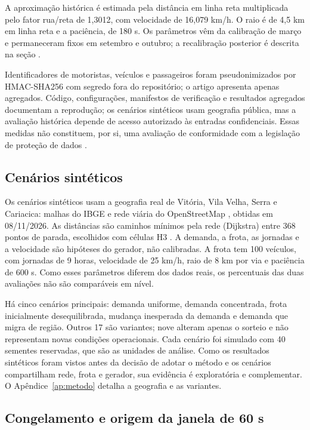 A aproximação histórica é estimada pela distância em linha reta multiplicada pelo fator rua/reta de 1,3012, com velocidade de 16,079 km/h. O raio é de 4,5 km em linha reta e a paciência, de 180 s. Os parâmetros vêm da calibração de março e permaneceram fixos em setembro e outubro; a recalibração posterior é descrita na seção .

Identificadores de motoristas, veículos e passageiros foram pseudonimizados por HMAC-SHA256 com segredo fora do repositório; o artigo apresenta apenas agregados. Código, configurações, manifestos de verificação e resultados agregados documentam a reprodução; os cenários sintéticos usam geografia pública, mas a avaliação histórica depende de acesso autorizado às entradas confidenciais. Essas medidas não constituem, por si, uma avaliação de conformidade com a legislação de proteção de dados \cite{brasil2018}.

\subsection{Cenários sintéticos}

Os cenários sintéticos usam a geografia real de Vitória, Vila Velha, Serra e Cariacica: malhas do IBGE \cite{ibgemalhas} e rede viária do OpenStreetMap \cite{osm}, obtidas em 08/11/2026. As distâncias são caminhos mínimos pela rede (Dijkstra) entre 368 pontos de parada, escolhidos com células H3 \cite{uberh3}. A demanda, a frota, as jornadas e a velocidade são hipóteses do gerador, não calibradas. A frota tem 100 veículos, com jornadas de 9 horas, velocidade de 25 km/h, raio de 8 km por via e paciência de 600 s. Como esses parâmetros diferem dos dados reais, os percentuais das duas avaliações não são comparáveis em nível.

Há cinco cenários principais: demanda uniforme, demanda concentrada, frota inicialmente desequilibrada, mudança inesperada da demanda e demanda que migra de região. Outros 17 são variantes; nove alteram apenas o sorteio e não representam novas condições operacionais. Cada cenário foi simulado com 40 sementes reservadas, que são as unidades de análise. Como os resultados sintéticos foram vistos antes da decisão de adotar o método e os cenários compartilham rede, frota e gerador, sua evidência é exploratória e complementar. O Apêndice~\ref{ap:metodo} detalha a geografia e as variantes.

\subsection{Congelamento e origem da janela de 60 s}

